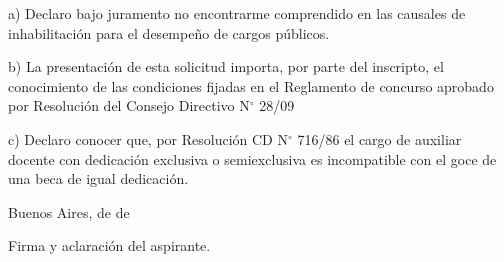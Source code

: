 \documentclass{article}
\newcommand{\fecha}[3]{#1 de #2 de #3}
\begin{document}
\bigskip
\bigskip
\bigskip
\bigskip


\noindent a) Declaro bajo juramento no encontrarme comprendido en las causales
de inhabilitación para el desempeño de cargos públicos.

\noindent b) La presentación de esta solicitud importa, por parte del inscripto,
el conocimiento de las condiciones fijadas en el Reglamento de concurso aprobado
por Resolución del Consejo Directivo N$^\circ$ 28/09

\noindent c) Declaro conocer que, por Resolución CD N$^\circ$ 716/86 el cargo de
auxiliar docente con dedicación exclusiva o semiexclusiva es incompatible con
el goce de una beca de igual dedicación.

\bigskip
\bigskip
\bigskip
\bigskip

\noindent Buenos Aires, \fecha{\numeroDiaEntregaDeDocumentacion}{\nombreMesEntregaDeDocumentacion}{\anioEntregaDeDocumentacion}

\bigskip
\bigskip
\bigskip

\noindent \hdashrule{6cm}{0.5pt}{0.75pt}

\noindent Firma y aclaración del aspirante.

\newpage


\bigskip
\bigskip
\end{document}
